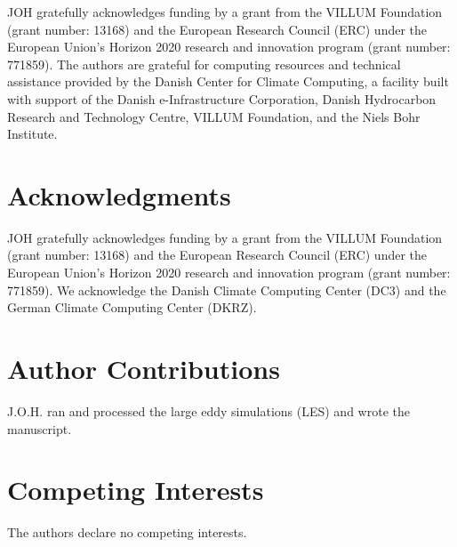 \documentclass[draft,linenumbers]{agujournal2019}
\begin{document}
\acknowledgments
JOH gratefully acknowledges funding by a grant from the VILLUM Foundation (grant number: 13168) and the European Research Council (ERC) under the European Union's Horizon 2020 research and innovation program (grant number: 771859).
The authors are grateful for computing resources and technical assistance provided by the Danish Center for Climate Computing, a facility built with support of the Danish e-Infrastructure Corporation, Danish Hydrocarbon Research and Technology Centre, VILLUM Foundation, and the Niels Bohr Institute.

\clearpage
\newpage
\pagebreak




%
%
%
%
%


\section*{Acknowledgments}
\noindent
JOH gratefully acknowledges funding by a grant from the VILLUM Foundation (grant number: 13168) and the European Research Council (ERC) under the European Union's Horizon 2020 research and innovation program (grant number: 771859). 
We acknowledge the Danish Climate Computing Center (DC3) and the German Climate Computing Center (DKRZ).

\section*{Author Contributions}
\noindent
J.O.H. ran and processed the large eddy simulations (LES) and wrote the manuscript.
\\
\section*{Competing Interests}
\noindent
The authors declare no competing interests.
\end{document}
